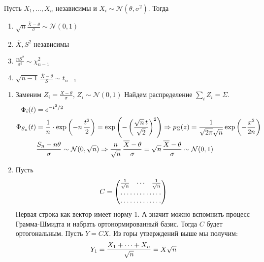 \documentclass[12pt,ebook]{../../../notes}
\begin{document}
\begin{lem}[Фишера]\label{lem:stat::fishlem::fishlem}
  Пусть $X_1, \dotsc, X_n$ независимы и $X_i \sim \mathcal N (\theta,\sigma^2)$. Тогда
  \begin{enumerate}
    \item 
      $\displaystyle\sqrt n \frac{\overline X - \theta}{\sigma} \sim \mathcal N(0,1)$
    \item $\overline{X}, S^2$ независимы 
    \item $\displaystyle \frac{n S^2}{\sigma^2} \sim \chi_{n-1}^2 $
    \item $\displaystyle \sqrt{n-1}\, \frac{\overline X - \theta }{S}  \sim t_{n-1}$
  \end{enumerate}
\end{lem}
\begin{ittproof}
  \begin{enumerate}
    \item Заменим $Z_i = \frac{X-\theta }{\sigma}$, $Z_i \sim \mathcal N(0,1)$
      Найдем распределение $\sum_i Z_i= \Sigma$. 
      \begin{align*}
        \Phi_i (t) &= e^{-t^2/2} \\
        \Phi_{S_n} (t) &= \frac 1 n \cdot \exp \left( -n\,\frac{t^2}{2} \right) 
        = \exp \left( -\left(\frac{\sqrt n\, t}{\sqrt 2} \right)^2\right)
        \Rightarrow 
        p_{\Sigma}(z) = \frac{1}{\sqrt{2\pi}\sqrt n} \exp \left( -\frac{x^2}{2 n}\right)\\
        &\frac{S_n - n\theta}{\sigma} \sim \mathcal N (0, \sqrt n) \Rightarrow 
        \frac{n}{\sqrt n} \,  \frac{\overline{X} - \theta}{\sigma} = \sqrt n\,\frac{\overline{X} -\theta}{\sigma}
        \sim \mathcal N(0,1)
      \end{align*}
    \item Пусть
      \[
        C = \begin{pmatrix}
          \frac{1}{\sqrt n} & \cdots & \frac{1}{\sqrt n} \\
          \hdotsfor{3} \\
          \hdotsfor{3}
        \end{pmatrix}
      \]
      Первая строка как вектор имеет норму 1. А значит можно вспомнить процесс Грамма-Шмидта и
      набрать ортонормированный базис. Тогда $C$ будет ортогональным. Пусть $Y = CX$. Из горы
      утверждений выше мы получим:
      \begin{align*}
        Y_1 &= \frac{X_1 + \dotsb + X_n}{\sqrt n} = \av X \sqrt n \\

\end{align*}
\end{enumerate}
\end{ittproof}
\end{document}
